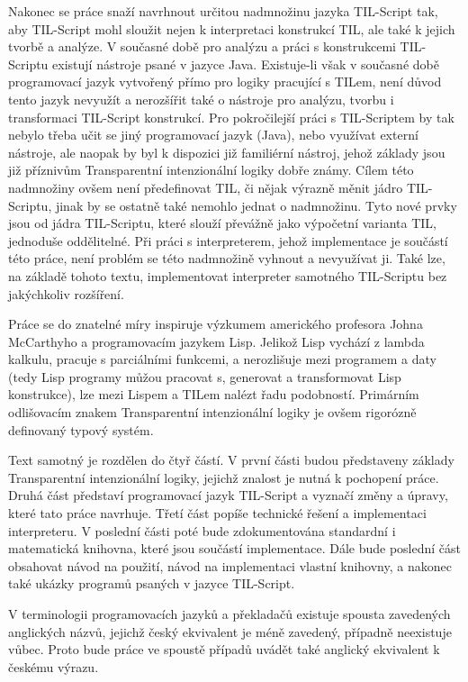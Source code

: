 Nakonec se práce snaží navrhnout určitou nadmnožinu jazyka TIL-Script tak, aby TIL-Script mohl
sloužit nejen k interpretaci konstrukcí TIL, ale také k jejich tvorbě a analýze. V současné době
pro analýzu a práci s konstrukcemi TIL-Scriptu existují nástroje psané v jazyce Java. Existuje-li
však v současné době programovací jazyk vytvořený přímo pro logiky pracující s TILem, není důvod
tento jazyk nevyužít a nerozšířit také o nástroje pro analýzu, tvorbu i transformaci TIL-Script
konstrukcí. Pro pokročilejší práci s TIL-Scriptem by tak nebylo třeba učit se jiný programovací
jazyk (Java), nebo využívat externí nástroje, ale naopak by byl k dispozici již familiérní nástroj,
jehož základy jsou již příznivům Transparentní intenzionální logiky dobře známy. Cílem této
nadmnožiny ovšem není předefinovat TIL, či nějak výrazně měnit jádro TIL-Scriptu, jinak by se
ostatně také nemohlo jednat o nadmnožinu. Tyto nové prvky jsou od jádra TIL-Scriptu, které slouží
převážně jako výpočetní varianta TIL, jednoduše oddělitelné. Při práci s interpreterem, jehož
implementace je součástí této práce, není problém se této nadmnožině vyhnout a nevyužívat ji.
Také lze, na základě tohoto textu, implementovat interpreter samotného TIL-Scriptu bez jakýchkoliv
rozšíření.

Práce se do znatelné míry inspiruje výzkumem amerického profesora Johna McCarthyho a programovacím
jazykem Lisp. Jelikož Lisp vychází z lambda kalkulu, pracuje s parciálními funkcemi, a nerozlišuje
mezi programem a daty (tedy Lisp programy můžou pracovat s, generovat a transformovat Lisp
konstrukce), lze mezi Lispem a TILem nalézt řadu podobností. Primárním odlišovacím znakem
Transparentní intenzionální logiky je ovšem rigorózně definovaný typový systém.

Text samotný je rozdělen do čtyř částí. V první části budou představeny základy Transparentní
intenzionální logiky, jejichž znalost je nutná k pochopení práce. Druhá část představí programovací
jazyk TIL-Script a vyznačí změny a úpravy, které tato práce navrhuje. Třetí část popíše technické
řešení a implementaci interpreteru. V poslední části poté bude zdokumentována standardní i
matematická knihovna, které jsou součástí implementace. Dále bude poslední část obsahovat návod
na použití, návod na implementaci vlastní knihovny, a nakonec také ukázky programů psaných v jazyce
TIL-Script.

V terminologii programovacích jazyků a překladačů existuje spousta zavedených anglických názvů,
jejichž český ekvivalent je méně zavedený, případně neexistuje vůbec. Proto bude práce ve spoustě
případů uvádět také anglický ekvivalent k českému výrazu.

\endinput
